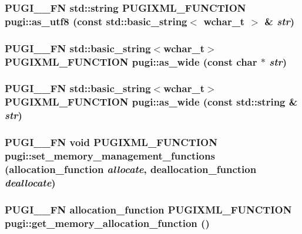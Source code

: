 \hypertarget{namespacepugi_b4be9ab3dc86b13599b9f2fd2f778dfb}{
\subsubsection[as\_\-utf8]{\setlength{\rightskip}{0pt plus 5cm}PUGI\_\-\_\-FN std::string PUGIXML\_\-FUNCTION pugi::as\_\-utf8 (const std::basic\_\-string$<$ wchar\_\-t $>$ \& {\em str})}}
\label{namespacepugi_b4be9ab3dc86b13599b9f2fd2f778dfb}


\hypertarget{namespacepugi_c2a9782a1c3c725703c6e4533e735d9b}{
\subsubsection[as\_\-wide]{\setlength{\rightskip}{0pt plus 5cm}PUGI\_\-\_\-FN std::basic\_\-string$<$wchar\_\-t$>$ PUGIXML\_\-FUNCTION pugi::as\_\-wide (const char $\ast$ {\em str})}}
\label{namespacepugi_c2a9782a1c3c725703c6e4533e735d9b}


\hypertarget{namespacepugi_f33046c0db1ff7b3f63327d32fc6dca7}{
\subsubsection[as\_\-wide]{\setlength{\rightskip}{0pt plus 5cm}PUGI\_\-\_\-FN std::basic\_\-string$<$wchar\_\-t$>$ PUGIXML\_\-FUNCTION pugi::as\_\-wide (const std::string \& {\em str})}}
\label{namespacepugi_f33046c0db1ff7b3f63327d32fc6dca7}


\hypertarget{namespacepugi_993c6b7947c1dec98936510d9e5fe778}{
\subsubsection[set\_\-memory\_\-management\_\-functions]{\setlength{\rightskip}{0pt plus 5cm}PUGI\_\-\_\-FN void PUGIXML\_\-FUNCTION pugi::set\_\-memory\_\-management\_\-functions (allocation\_\-function {\em allocate}, deallocation\_\-function {\em deallocate})}}
\label{namespacepugi_993c6b7947c1dec98936510d9e5fe778}


\hypertarget{namespacepugi_b36e5aed4e5c952687b42d69daf981eb}{
\subsubsection[get\_\-memory\_\-allocation\_\-function]{\setlength{\rightskip}{0pt plus 5cm}PUGI\_\-\_\-FN allocation\_\-function PUGIXML\_\-FUNCTION pugi::get\_\-memory\_\-allocation\_\-function ()}}
\label{namespacepugi_b36e5aed4e5c952687b42d69daf981eb}


